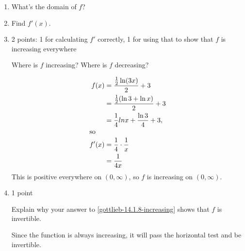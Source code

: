 \documentclass{article}
\begin{document}
\begin{enumerate}
  \begin{enumerate}
  \item

    \begin{problem}[0.5in]
      What's the domain of $f$?
    \end{problem}

  \item
    \begin{problem}[1in]
      Find $f'(x)$.
    \end{problem}

  \item \label{gottlieb-14.1.8-increasing}

    \begin{grading}
      2 points: 1 for calculating $f'$ correctly, 1 for using that to show  that $f$ is increasing everywhere
    \end{grading}

    \begin{problem}[\vfill]
      Where is $f$ increasing? Where is $f$ decreasing? 
    \end{problem}

    \begin{solution}
      \begin{align*}
        f(x) &= \frac{\frac{1}{2} \ln (3x)}{2} + 3 \\
        &= \frac{\frac{1}{2} (\ln 3 + \ln x)}{2} + 3 \\
        &= \frac{1}{4} ln x + \frac{\ln 3}{4} + 3, \\
        \shortintertext{so}
        f'(x) &= \frac{1}{4} \cdot \frac{1}{x} \\
        &= \frac{1}{4x}
      \end{align*}
      This is positive everywhere on $(0, \infty)$, so $f$ is increasing on $(0, \infty)$. 
    \end{solution} 

  \item

    \begin{grading}
      1 point
    \end{grading}

    \begin{problem}[0.75in]
      Explain why your answer to \ref{gottlieb-14.1.8-increasing} shows that $f$ is invertible. 
    \end{problem}

    \begin{solution} 
      Since the function is always increasing, it will pass the horizontal test and be invertible.  
    \end{solution}


\end{enumerate}
\end{enumerate}
\end{document}
